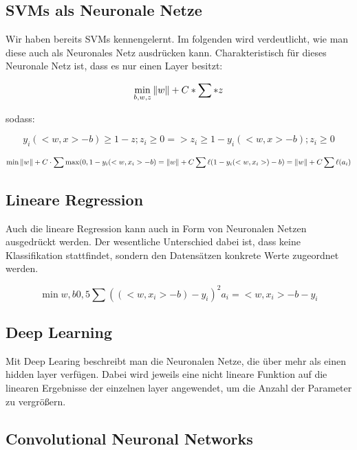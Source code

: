 \subsection{SVMs als Neuronale Netze}

Wir haben bereits SVMs kennengelernt. Im folgenden wird verdeutlicht, wie man diese auch als Neuronales Netz ausdrücken kann. Charakteristisch für dieses Neuronale Netz ist, dass es nur einen Layer besitzt:

\begin{equation*}
\min\limits_{b,w,z} \left\lVert w\right\rVert + C * \sum * z
\end {equation*}

sodass:

\begin{equation*}
y_i (<w,x> - b) \geq 1 - z ; z_i \geq 0 => z_i \geq 1- y_i (<w,x> - b); z_i \geq 0
\end {equation*}

\begin{equation*}
\min \left\lVert w\right\rVert + C \cdot \sum \max (0, 1-y_i (<w,x_i>-b) = \left\lVert w\right\rVert + C \sum \ell ( 1-y_i (<w,x_i>)-b) = \left\lVert w\right\rVert + C \sum \ell (a_i)
\end{equation*}

\subsection{Lineare Regression}

Auch die lineare Regression kann auch in Form von Neuronalen Netzen ausgedrückt werden. Der wesentliche Unterschied dabei ist, dass keine Klassifikation stattfindet, sondern den Datensätzen konkrete Werte zugeordnet werden.

\begin{equation*}
\min\limits{w,b} 0,5 \sum ((<w,x_i> - b) -y_i)^2
a_i = <w,x_i> -b-y_i
\end{equation*}

\subsection{Deep Learning}

Mit Deep Learing beschreibt man die Neuronalen Netze, die über mehr als einen hidden layer verfügen. Dabei wird jeweils eine nicht lineare Funktion auf die linearen Ergebnisse der einzelnen layer angewendet, um die Anzahl der Parameter zu vergrößern.

\subsection{Convolutional Neuronal Networks}
